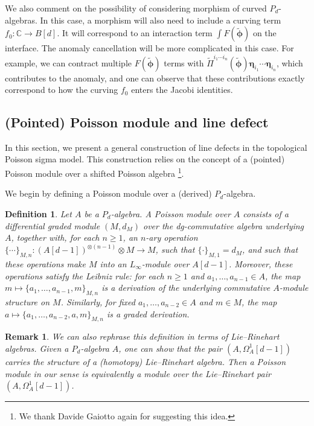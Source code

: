 \documentclass[11pt]{article}
\newcommand{\C}{\mathbb{C}}
\numberwithin{equation}{section}
\newtheorem{definition}{Definition}[section]
\newtheorem{remark}{Remark}[section]
\begin{document}
We also comment on the possibility of considering morphism of curved $P_d$-algebras. In this case, a morphism will also need to include a curving term $f_0: \C \to B[d]$. It will correspond to an interaction term $\int F(\widetilde{\boldsymbol{\phi}})$ on the interface. The anomaly cancellation will be more complicated in this case. For example, we can contract multiple $F(\widetilde{\boldsymbol{\phi}})$ terms with $\widetilde{\Pi}^{i_1\cdots i_n}(\widetilde{\boldsymbol{\phi}})\boldsymbol{\eta}_{i_1}\cdots \boldsymbol{\eta}_{i_n}$, which contributes to the anomaly, and one can observe that these contributions exactly correspond to how the curving $f_0$ enters the Jacobi identities.

\subsection{(Pointed) Poisson module and line defect}
\label{sec:pmod_line}
In this section, we present a general construction of line defects in the topological Poisson sigma model. This construction relies on the concept of a (pointed) Poisson module over a shifted Poisson algebra \footnote{We thank Davide Gaiotto again for suggesting this idea.}. 

We begin by defining a Poisson module over a (derived) $P_d$-algebra.
\begin{definition}
Let $A$ be a $P_d$-algebra. A Poisson module over $A$ consists of a differential graded module $(M,d_M)$ over the dg-commutative algebra underlying $A$, together with, for each $n\ge 1$, an $n$-ary operation $\{\cdots\}_{M,n}:(A[d-1])^{\otimes (n-1)}\otimes M\to M$, such that $\{\cdot\}_{M,1}=d_M$, and such that these operations make $M$ into an $L_\infty$-module over $A[d-1]$. Moreover, these operations satisfy the Leibniz rule: for each $n\geq 1$ and $a_1,\dots,a_{n-1}\in A$, the map $m \mapsto \{a_1,\dots,a_{n-1},m\}_{M,n}$ is a derivation of the underlying commutative $A$-module structure on $M$. Similarly, for fixed $a_1,\dots,a_{n-2}\in A$ and $m\in M$, the map $a \mapsto \{a_1,\dots,a_{n-2},a,m\}_{M,n}$ is a graded derivation.
\end{definition}
\begin{remark}
We can also rephrase this definition in terms of Lie--Rinehart algebras. Given a $P_d$-algebra $A$, one can show that the pair $(A,\Omega^1_{A}[d-1])$ carries the structure of a (homotopy) Lie--Rinehart algebra. Then a Poisson module in our sense is equivalently a module over the Lie--Rinehart pair $(A,\Omega^1_{A}[d-1])$.
\end{remark}
\end{document}
